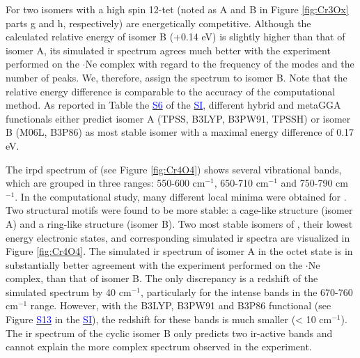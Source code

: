 \begin{refsection}
For  two isomers with a high spin 12-tet (noted as A and B in Figure \ref{fig:Cr3Ox} parts g and h, respectively) are energetically competitive. Although the calculated relative energy of isomer B (+0.14 eV) is slightly higher than that of isomer A, its simulated \acrshort{ir} spectrum agrees much better with the experiment performed on the $\boldsymbol{\cdot}$Ne complex with regard to the frequency of the modes and the number of peaks. We, therefore, assign the spectrum to isomer B. Note that the relative energy difference is comparable to the accuracy of the computational method. As reported in Table the \href{https://pubs.acs.org/doi/suppl/10.1021/acs.jpcc.8b10035/suppl_file/jp8b10035_si_002.pdf}{\textcolor{blue}{S6}} of the \href{https://pubs.acs.org/doi/suppl/10.1021/acs.jpcc.8b10035/suppl_file/jp8b10035_si_002.pdf}{\textcolor{blue}{SI}}, different hybrid and metaGGA functionals either predict isomer A (TPSS, B3LYP, B3PW91, TPSSH) or isomer B (M06L, B3P86) as most stable isomer with a maximal energy difference of 0.17 eV.




The \acrshort{irpd} spectrum of  (see Figure \ref{fig:Cr4O4}) shows several vibrational bands, which are grouped in three ranges: 550-600 cm$^{-1}$, 650-710 cm$^{-1}$ and 750-790 cm$^{-1}$. In the computational study, many different local minima were obtained for . Two structural motifs were found to be more stable: a cage-like structure (isomer A) and a ring-like structure (isomer B). Two most stable isomers of , their lowest energy electronic states, and corresponding simulated \acrshort{ir} spectra are visualized in Figure \ref{fig:Cr4O4}. The simulated \acrshort{ir} spectrum of isomer A in the octet state is in substantially better agreement with the experiment performed on the $\boldsymbol{\cdot}$Ne complex, than that of isomer B. The only discrepancy is a redshift of the simulated spectrum by 40 cm$^{-1}$,  particularly for the intense bands in the 670-760 cm$^{-1}$ range. However, with the B3LYP, B3PW91 and B3P86 functional (see Figure \href{https://pubs.acs.org/doi/suppl/10.1021/acs.jpcc.8b10035/suppl_file/jp8b10035_si_002.pdf}{\textcolor{blue}{S13}} in the \href{https://pubs.acs.org/doi/suppl/10.1021/acs.jpcc.8b10035/suppl_file/jp8b10035_si_002.pdf}{\textcolor{blue}{SI}}), the redshift for these bands is much smaller (< 10 cm$^{-1}$). The \acrshort{ir} spectrum of the cyclic isomer B only predicts two \acrshort{ir}-active bands and cannot explain the more complex spectrum observed in the experiment.



\end{refsection}
